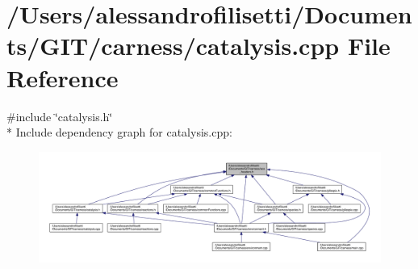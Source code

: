 \hypertarget{a00053}{\section{/\-Users/alessandrofilisetti/\-Documents/\-G\-I\-T/carness/catalysis.cpp File Reference}
\label{a00053}
}
{\ttfamily \#include \char`\"{}catalysis.\-h\char`\"{}}\\*
Include dependency graph for catalysis.\-cpp\-:
\nopagebreak
\begin{figure}[H]
\begin{center}
\leavevmode
\includegraphics[width=350pt]{a00165}
\end{center}
\end{figure}

